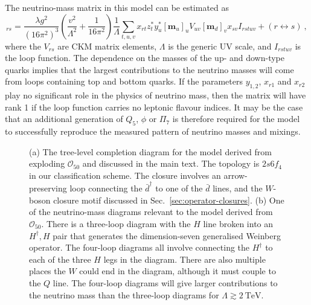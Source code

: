 The neutrino-mass matrix in this model can be estimated as
\begin{equation}
  [\mathbf{m}_{\nu}]_{rs} = \frac{\lambda g^{2}}{(16\pi^{2})^{3}} \left( \frac{v^{2}}{\Lambda^{2}} + \frac{1}{16\pi^{2}}\right) \frac{1}{\Lambda}\sum_{t,u,v} x_{rt} z^{*}_{t} y^{*}_{u} [\mathbf{m}_{u}]_{u} V_{uv} [\mathbf{m}_{d}]_{v} x_{sv} I_{rstuv} + (r \leftrightarrow s) \ ,
\end{equation}
where the $V_{rs}$ are CKM matrix elements, $\Lambda$ is the generic UV scale,
and $I_{rstuv}$ is the loop function. The dependence on the masses of the up-
and down-type quarks implies that the largest contributions to the neutrino
masses will come from loops containing top and bottom quarks. If the parameters
$y_{1,2}$, $x_{r1}$ and $x_{r2}$ play no significant role in the physics of
neutrino mass, then the matrix will have rank 1 if the loop function carries no
leptonic flavour indices. It may be the case that an additional generation of
$Q_{5}$, $\phi$ or $\Pi_{7}$ is therefore required for the model to successfully
reproduce the measured pattern of neutrino masses and mixings.

\begin{figure}[t]
  \centering
  \caption[(a) The tree-level completion diagram for the model derived from
  exploding $\mathcal{O}_{50}$ and discussed in the main text. (b) One of the
  neutrino-mass diagrams relevant to the model derived from
  $\mathcal{O}_{50}$.]{(a) The tree-level completion diagram for the model
    derived from exploding $\mathcal{O}_{50}$ and discussed in the main text.
    The topology is $2s6f_{4}$ in our classification scheme. The closure
    involves an arrow-preserving loop connecting the $\bar{d}^{\dagger}$ to one
    of the $\bar{d}$ lines, and the $W$-boson closure motif discussed in
    Sec.~\ref{sec:operator-closures}. (b) One of the neutrino-mass diagrams
    relevant to the model derived from $\mathcal{O}_{50}$. There is a three-loop
    diagram with the $H$ line broken into an $H^{\dagger}, H$ pair that
    generates the dimension-seven generalised Weinberg operator. The four-loop
    diagrams all involve connecting the $H^{\dagger}$ to each of the three $H$
    legs in the diagram. There are also multiple places the $W$ could end in the
    diagram, although it must couple to the $Q$ line. The four-loop diagrams
    will give larger contributions to the neutrino mass than the three-loop
    diagrams for $\Lambda \gtrsim \SI{2}{\TeV}$.}
  \label{fig:lowscale-example}
\end{figure}

